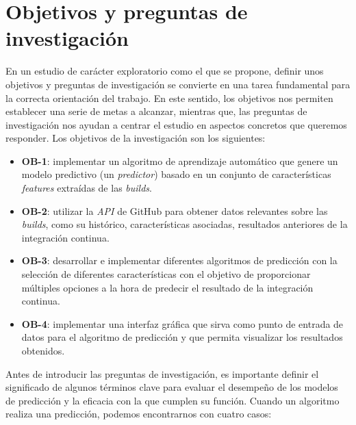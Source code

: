\section{Objetivos y preguntas de investigación} \label{sec:research_questions}
En un estudio de carácter exploratorio como el que se propone, definir unos objetivos y preguntas
de investigación se convierte en una tarea fundamental para la correcta orientación del trabajo.
En este sentido, los objetivos nos permiten establecer una serie de metas a alcanzar, mientras
que, las preguntas de investigación nos ayudan a centrar el estudio en aspectos concretos que
queremos responder. Los objetivos de la investigación son los siguientes:

\begin{itemize}
    \item \textbf{OB-1}: implementar un algoritmo de aprendizaje automático que genere un modelo
          predictivo (un \textit{predictor}) basado en un conjunto de características
          \textit{features} extraídas de las \textit{builds}.\\
    \item \textbf{OB-2}: utilizar la \textit{API} de GitHub para obtener datos relevantes sobre
          las \textit{builds}, como su histórico, características asociadas, resultados anteriores
          de la integración continua.\\
    \item \textbf{OB-3}: desarrollar e implementar diferentes algoritmos de predicción con la
          selección de diferentes características con el objetivo de proporcionar múltiples
          opciones a la hora de predecir el resultado de la integración continua.\\
    \item \textbf{OB-4}: implementar una interfaz gráfica que sirva como punto de entrada de
          datos para el algoritmo de predicción y que permita visualizar los resultados
          obtenidos.
\end{itemize}

Antes de introducir las preguntas de investigación, es importante definir el significado de 
algunos términos clave para evaluar el desempeño de los modelos de predicción y la eficacia con
la que cumplen su función. Cuando un algoritmo realiza una predicción, podemos encontrarnos
con cuatro casos:

